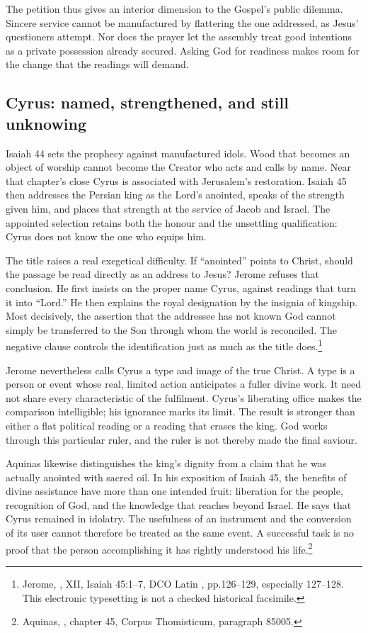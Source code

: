 The petition thus gives an interior dimension to the Gospel's public dilemma. Sincere service cannot be manufactured by flattering the one addressed, as Jesus' questioners attempt. Nor does the prayer let the assembly treat good intentions as a private possession already secured. Asking God for readiness makes room for the change that the readings will demand.

\subsection{Cyrus: named, strengthened, and still unknowing}
Isaiah 44 sets the prophecy against manufactured idols. Wood that becomes an object of worship cannot become the Creator who acts and calls by name. Near that chapter's close Cyrus is associated with Jerusalem's restoration. Isaiah 45 then addresses the Persian king as the Lord's anointed, speaks of the strength given him, and places that strength at the service of Jacob and Israel. The appointed selection retains both the honour and the unsettling qualification: Cyrus does not know the one who equips him.

The title raises a real exegetical difficulty. If ``anointed'' points to Christ, should the passage be read directly as an address to Jesus? Jerome refuses that conclusion. He first insists on the proper name Cyrus, against readings that turn it into ``Lord.'' He then explains the royal designation by the insignia of kingship. Most decisively, the assertion that the addressee has not known God cannot simply be transferred to the Son through whom the world is reconciled. The negative clause controls the identification just as much as the title does.\footnote{Jerome, , XII, Isaiah 45:1--7, DCO Latin , pp.126--129, especially 127--128. This electronic typesetting is not a checked historical facsimile.}

Jerome nevertheless calls Cyrus a type and image of the true Christ. A type is a person or event whose real, limited action anticipates a fuller divine work. It need not share every characteristic of the fulfilment. Cyrus's liberating office makes the comparison intelligible; his ignorance marks its limit. The result is stronger than either a flat political reading or a reading that erases the king. God works through this particular ruler, and the ruler is not thereby made the final saviour.

Aquinas likewise distinguishes the king's dignity from a claim that he was actually anointed with sacred oil. In his exposition of Isaiah 45, the benefits of divine assistance have more than one intended fruit: liberation for the people, recognition of God, and the knowledge that reaches beyond Israel. He says that Cyrus remained in idolatry. The usefulness of an instrument and the conversion of its user cannot therefore be treated as the same event. A successful task is no proof that the person accomplishing it has rightly understood his life.\footnote{Aquinas, , chapter 45, Corpus Thomisticum, paragraph 85005.}

